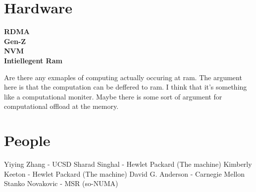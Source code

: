 \section{Hardware}

\textbf{RDMA}
\\
\textbf{Gen-Z}
\\
\textbf{NVM}
\\
\textbf{Intiellegent Ram}

Are there any exmaples of computing actually occuring at ram. The argument
here is that the computation can be deffered to ram. I think that it's
something like a computational moniter. Maybe there is some sort of argument
for computational offload at the memory.



\section{People}

Yiying Zhang - UCSD
Sharad Singhal - Hewlet Packard (The machine)
Kimberly Keeton - Hewlet Packard (The machine)
David G. Anderson - Carnegie Mellon
Stanko Novakovic - MSR (so-NUMA)
